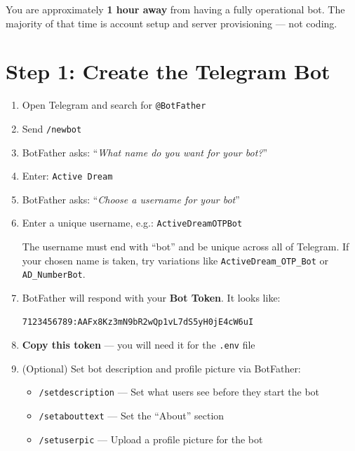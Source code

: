 \begin{infobox}
You are approximately \textbf{1 hour away} from having a fully operational bot. The majority of that time is account setup and server provisioning --- not coding.
\end{infobox}

\section{Step 1: Create the Telegram Bot}

\begin{enumerate}
    \item Open Telegram and search for \texttt{@BotFather}
    \item Send \texttt{/newbot}
    \item BotFather asks: ``\textit{What name do you want for your bot?}''
    \item Enter: \texttt{Active Dream}
    \item BotFather asks: ``\textit{Choose a username for your bot}''
    \item Enter a unique username, e.g.: \texttt{ActiveDreamOTPBot}
    
    \begin{warningbox}
    The username must end with ``bot'' and be unique across all of Telegram. If your chosen name is taken, try variations like \texttt{ActiveDream\_OTP\_Bot} or \texttt{AD\_NumberBot}.
    \end{warningbox}
    
    \item BotFather will respond with your \textbf{Bot Token}. It looks like:
    
    \begin{lstlisting}[style=bashstyle]
    7123456789:AAFx8Kz3mN9bR2wQp1vL7dS5yH0jE4cW6uI
    \end{lstlisting}
    
    \item \textbf{Copy this token} --- you will need it for the \texttt{.env} file
    
    \item (Optional) Set bot description and profile picture via BotFather:
    \begin{itemize}
        \item \texttt{/setdescription} --- Set what users see before they start the bot
        \item \texttt{/setabouttext} --- Set the ``About'' section
        \item \texttt{/setuserpic} --- Upload a profile picture for the bot
    \end{itemize}
\end{enumerate}

